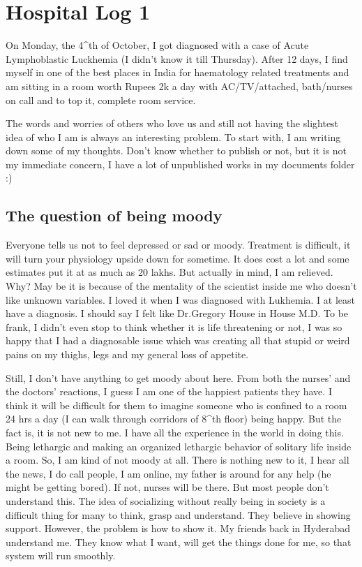 \section*{Hospital Log 1}
\vskip 2pt

On Monday, the 4^{th} of October, I got diagnosed with a case of Acute Lymphoblastic Luckhemia 
(I didn't know it till Thursday). After 12 days, I find myself in one of the best places in
 India for haematology related treatments and am sitting in a room worth Rupees 2k a day
 with AC/TV/attached, bath/nurses on call and to top it, complete room service.

The words and worries of others who love us and still not having the slightest idea of
 who I am is always an interesting problem. To start with, I am writing down some of
 my thoughts. Don't know whether to publish or not, but it is not my immediate concern,
 I have a lot of unpublished works in my documents folder :)

\subsection*{The question of being moody} 

Everyone tells us not to feel depressed or sad or moody. Treatment is difficult, it 
will turn your physiology upside down for sometime. It does cost a lot and some 
estimates put it at as much as 20 lakhs. But actually in mind, I am relieved. Why? May 
be it is because of the mentality of the scientist inside me who doesn't like unknown variables. I loved
 it when I was diagnosed with Lukhemia. I at least have a diagnosis. I should say I 
felt like Dr.Gregory House in House M.D. To be frank, I didn't even stop to think whether
 it is life threatening or not, I was so happy that I had a diagnosable issue which was 
creating all that stupid or weird pains on my thighs, legs and my general loss of appetite.

Still, I don't have anything to get moody about here. From both the nurses' and the doctors' reactions, I guess
I am one of the happiest patients they have. I think it will be difficult for them to 
imagine someone who is confined to a room 24 hrs a day (I can walk through corridors of
 8^{th} floor) being happy. But the fact is, it is not new to me. I have all the experience in 
the world in doing this. Being lethargic and making an organized lethargic behavior of
solitary life inside a room. So, I am kind of not moody at all. There is nothing new to it,
I hear all the news, I do call people, I am online, my father is around for any help (he might
be getting bored). If not, nurses will be there. But most people don't understand this. The
idea of socializing without really being in society is a difficult thing for many to think, 
grasp and understand. They believe in showing support. However, the problem is how to show it. My 
friends back in Hyderabad understand me. They know what I want, will get the things done for
me, so that system will run smoothly. 

